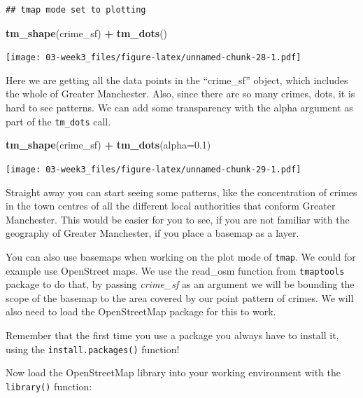 \documentclass[]{book}
\newenvironment{Shaded}{\begin{snugshade}}{\end{snugshade}}
\newcommand{\DataTypeTok}[1]{\textcolor[rgb]{0.13,0.29,0.53}{#1}}
\newcommand{\FloatTok}[1]{\textcolor[rgb]{0.00,0.00,0.81}{#1}}
\newcommand{\KeywordTok}[1]{\textcolor[rgb]{0.13,0.29,0.53}{\textbf{#1}}}
\newcommand{\NormalTok}[1]{#1}
\newcommand{\OperatorTok}[1]{\textcolor[rgb]{0.81,0.36,0.00}{\textbf{#1}}}
\newcommand{\StringTok}[1]{\textcolor[rgb]{0.31,0.60,0.02}{#1}}
\begin{document}
\begin{verbatim}
## tmap mode set to plotting
\end{verbatim}

\begin{Shaded}
\begin{Highlighting}[]
\KeywordTok{tm_shape}\NormalTok{(crime_sf) }\OperatorTok{+}\StringTok{ }
\StringTok{  }\KeywordTok{tm_dots}\NormalTok{() }
\end{Highlighting}
\end{Shaded}

\texttt{[image: 03-week3\_files/figure-latex/unnamed-chunk-28-1.pdf]}

Here we are getting all the data points in the ``crime\_sf'' object, which includes the whole of Greater Manchester. Also, since there are so many crimes, dots, it is hard to see patterns. We can add some transparency with the alpha argument as part of the \texttt{tm\_dots} call.

\begin{Shaded}
\begin{Highlighting}[]
\KeywordTok{tm_shape}\NormalTok{(crime_sf) }\OperatorTok{+}\StringTok{ }
\StringTok{  }\KeywordTok{tm_dots}\NormalTok{(}\DataTypeTok{alpha=}\FloatTok{0.1}\NormalTok{) }
\end{Highlighting}
\end{Shaded}

\texttt{[image: 03-week3\_files/figure-latex/unnamed-chunk-29-1.pdf]}

Straight away you can start seeing some patterns, like the concentration of crimes in the town centres of all the different local authorities that conform Greater Manchester. This would be easier for you to see, if you are not familiar with the geography of Greater Manchester, if you place a basemap as a layer.

You can also use basemaps when working on the plot mode of \texttt{tmap}. We could for example use OpenStreet maps. We use the read\_osm function from \texttt{tmaptools} package to do that, by passing \emph{crime\_sf} as an argument we will be bounding the scope of the basemap to the area covered by our point pattern of crimes. We will also need to load the OpenStreetMap package for this to work.

Remember that the first time you use a package you always have to install it, using the \texttt{install.packages()} function!

Now load the OpenStreetMap library into your working environment with the \texttt{library()} function:
\end{document}
